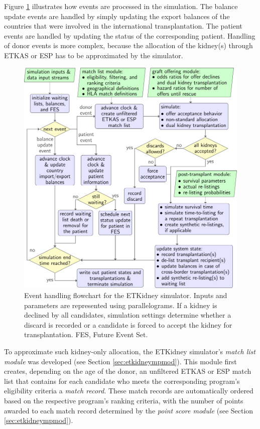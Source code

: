 \documentclass[11pt,twoside,]{book}
\begin{document}
Figure \ref{fig:ch8fig2} illustrates how events are processed in the simulation.
The balance update events are handled by simply updating the export balances
of the countries that were involved in the international transplantation. The
patient events are handled by updating the status
of the corresponding patient. Handling of donor events is more complex, because
the allocation of the kidney(s) through ETKAS or ESP has to be approximated
by the simulator.

\begin{figure}[ht]

{\centering \includegraphics[width=0.9\linewidth]{figures/ch8//fig2-event_handling_flowchart} 

}

\caption{Event handling flowchart for the ETKidney simulator. Inputs and parameters are represented using parallelograms. If a kidney is declined by all candidates, simulation settings determine whether a discard is recorded or a candidate is forced to accept the kidney for transplantation. FES, Future Event Set.}\label{fig:ch8fig2}
\end{figure}

\newpage
To approximate such kidney-only allocation, the ETKidney simulator's
\emph{match list module} was developed (see Section
\ref{sec:etkidneympmod}). This module first
creates, depending on the age of the donor, an unfiltered ETKAS or ESP
match list that contains for each candidate who meets the
corresponding program's eligibility criteria a \emph{match record}. These match records
are automatically ordered based on the respective
program's ranking criteria, with the number of points awarded to each
match record determined by the \emph{point score module} (see Section
\ref{sec:etkidneympmod}).
\end{document}
